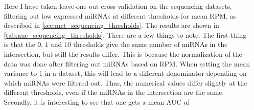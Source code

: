 {{{{{{{{{{{{Here I have taken leave-one-out cross validation on the sequencing datasets, filtering out low expressed miRNAs at different thresholds for mean RPM, as described in \autoref{sec:met_sequencing_thresholds}. The results are shown in \autoref{tab:auc_sequencing_thresholds}. There are a few things to note. The first thing is that the $0$, $1$ and $10$ thresholds give the same number of miRNAs in the intersection, but still the results differ. This is because the normalization of the data was done after filtering out miRNAs based on RPM. When setting the mean variance to $1$ in a dataset, this will lead to a different denominator depending on which miRNAs were filtered out. Thus, the numerical values differ slightly at the different thresholds, even if the miRNAs in the intersection are the same. Secondly, it is interesting to see that one gets a mean AUC of \py{"$%

\begin{table}
    \caption{The resulting AUC-values when doing the experiment as described in \autoref{sec:met_sequencing_thresholds}. The threshold is the mean RPM needed for a miRNA-sequence to be included in the dataset. Intersection (I) and union (U) represent whether the model was trained on the intersection of the miRNAs (logistic regression) or the union of the miRNAs (XGBoost). \# miRNA is the number of miRNAs in the intersection or the union of the datasets, when filtered according to the thresholds}
    \label{tab:auc_sequencing_thresholds}
    \sisetup{round-mode=places, round-precision=3}
    \begin{center}
        \csvreader[head to column names, tabular=|r|r|r|r|r|,
        table head = \hline \bfseries Threshold & \bfseries AUC (I) & \bfseries \# miRNA (U) & \bfseries AUC (U) & \bfseries \# miRNA (U)\\\hline,
        late after line=\\, late after last line=\\\hline]{tables/rpm_threshold_cv.csv}{}{
            \csvcoli & \num{\csvcolii} & \csvcoliii & \num{\csvcoliv} & \csvcolv
        }
    \end{center}
\end{table}

\begin{pycode}
df2 = pd.read_csv("tables/rpm_threshold_aucs_pvalue.csv")
\end{pycode}

}}}}}}}}}}}}}
